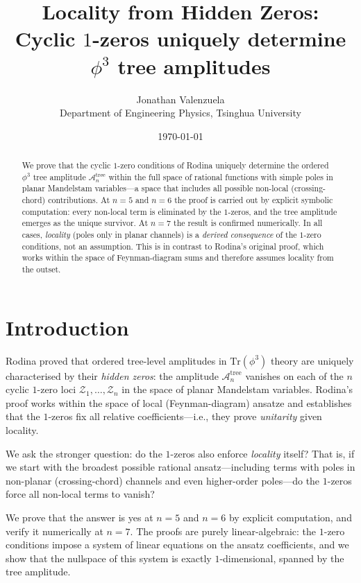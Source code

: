 \documentclass[11pt]{article}
\title{Locality from Hidden Zeros:\\
Cyclic $1$-zeros uniquely determine $\phi^3$ tree amplitudes}
\author{Jonathan Valenzuela\\
\small Department of Engineering Physics, Tsinghua University}
\date{\today}
\theoremstyle{plain}
\theoremstyle{definition}
\newcommand{\cA}{\mathcal{A}}
\newcommand{\cZ}{\mathcal{Z}}
\begin{document}
\maketitle

\begin{abstract}
We prove that the cyclic $1$-zero conditions of Rodina uniquely determine the
ordered $\phi^3$ tree amplitude $\cA_n^{\mathrm{tree}}$ within the full space of
rational functions with simple poles in planar Mandelstam variables---a space that
includes all possible non-local (crossing-chord) contributions. At $n=5$ and $n=6$
the proof is carried out by explicit symbolic computation: every non-local term is
eliminated by the $1$-zeros, and the tree amplitude emerges as the unique survivor.
At $n=7$ the result is confirmed numerically. In all cases, \emph{locality}
(poles only in planar channels) is a \emph{derived consequence} of the $1$-zero
conditions, not an assumption. This is in contrast to Rodina's original proof,
which works within the space of Feynman-diagram sums and therefore assumes locality
from the outset.
\end{abstract}

\tableofcontents

\section{Introduction}

Rodina \cite{Rodina2024} proved that ordered tree-level amplitudes in $\mathrm{Tr}(\phi^3)$
theory are uniquely characterised by their \emph{hidden zeros}: the amplitude
$\cA_n^{\mathrm{tree}}$ vanishes on each of the $n$ cyclic $1$-zero loci
$\cZ_1, \ldots, \cZ_n$ in the space of planar Mandelstam variables. Rodina's proof
works within the space of local (Feynman-diagram) ansatze and establishes that the
$1$-zeros fix all relative coefficients---i.e., they prove \emph{unitarity} given
locality.

We ask the stronger question: do the $1$-zeros also enforce \emph{locality} itself?
That is, if we start with the broadest possible rational ansatz---including terms with
poles in non-planar (crossing-chord) channels and even higher-order poles---do the
$1$-zeros force all non-local terms to vanish?

We prove that the answer is yes at $n = 5$ and $n = 6$ by explicit computation, and
verify it numerically at $n = 7$. The proofs are purely linear-algebraic: the $1$-zero
conditions impose a system of linear equations on the ansatz coefficients, and we show
that the nullspace of this system is exactly $1$-dimensional, spanned by the tree
amplitude.
\end{document}
